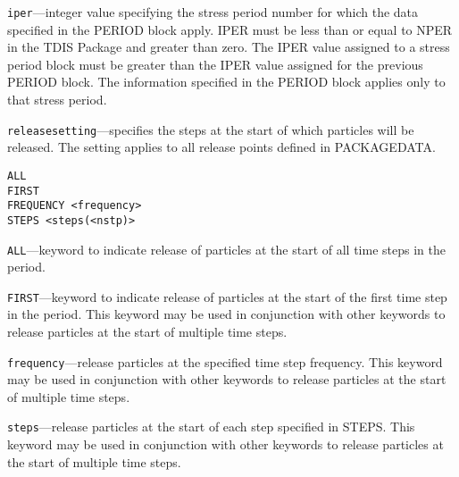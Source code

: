\begin{description}
\item \texttt{iper}---integer value specifying the stress period number for which the data specified in the PERIOD block apply. IPER must be less than or equal to NPER in the TDIS Package and greater than zero. The IPER value assigned to a stress period block must be greater than the IPER value assigned for the previous PERIOD block. The information specified in the PERIOD block applies only to that stress period.

\item \texttt{releasesetting}---specifies the steps at the start of which particles will be released.  The setting applies to all release points defined in PACKAGEDATA.

\begin{lstlisting}[style=blockdefinition]
ALL
FIRST
FREQUENCY <frequency>
STEPS <steps(<nstp)>
\end{lstlisting}

\item \texttt{ALL}---keyword to indicate release of particles at the start of all time steps in the period.

\item \texttt{FIRST}---keyword to indicate release of particles at the start of the first time step in the period. This keyword may be used in conjunction with other keywords to release particles at the start of multiple time steps.

\item \texttt{frequency}---release particles at the specified time step frequency. This keyword may be used in conjunction with other keywords to release particles at the start of multiple time steps.

\item \texttt{steps}---release particles at the start of each step specified in STEPS. This keyword may be used in conjunction with other keywords to release particles at the start of multiple time steps.

\end{description}

